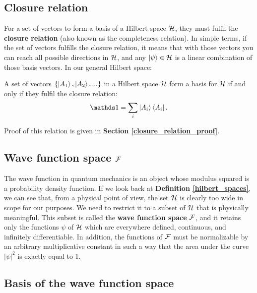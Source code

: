 \subsection{Closure relation}

For a set of vectors to form a basis of a Hilbert space $\mathcal{H}$, they must fulfil the \textbf{closure relation} (also known as the completeness relation). In simple terms, if the set of vectors fulfills the closure relation, it means that with those vectors you can reach all possible directions in $\mathcal{H}$, and any $\ket{\psi}\in\mathcal{H}$ is a linear combination of those basis vectors. In our general Hilbert space:

\begin{definition}
    A set of vectors $\{\ket{A_1}, \ket{A_2}, ...\}$ in a Hilbert space $\mathcal{H}$ form a basis for $\mathcal{H}$ if and only if they fulfil the closure relation:
    \begin{equation}
        \Imat = \sum_i\ket{A_i} \bra{A_i}.
    \end{equation}
\end{definition}

Proof of this relation is given in \textbf{Section \ref{closure_relation_proof}}.

\subsection{Wave function space $\mathcal{F}$}

The wave function in quantum mechanics is an object whose modulus squared is a probability density function. If we look back at \textbf{Definition \ref{hilbert_spaces}}, we can see that, from a physical point of view, the set $\mathcal{H}$ is clearly too wide in scope for our purposes. We need to restrict it to a subset of $\mathcal{H}$ that is physically meaningful. This subset is called the \textbf{wave function space} $\mathcal{F}$, and it retains only the functions $\psi$ of $\mathcal{H}$ which are everywhere defined, continuous, and infinitely differentiable. In addition, the functions of $\mathcal{F}$ must be normalizable by an arbitrary multiplicative constant in such a way that the area under the curve $|\psi|^2$ is exactly equal to $1$.

\subsection{Basis of the wave function space}

